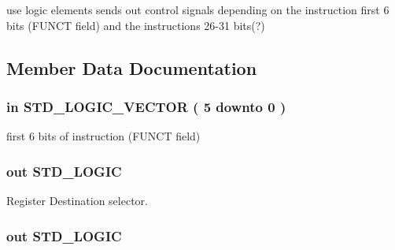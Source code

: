 use logic elements sends out control signals depending on the instruction first 6 bits (\-F\-U\-N\-C\-T field) and the instructions 26-\/31 bits(?) 

\subsection{\-Member \-Data \-Documentation}
\hypertarget{class_control_a837426aa7a23a4b3f1534d7a5a47fd84}{
\subsubsection[{\-Instruction\-\_\-funct}]{ {\bfseries in } {\bfseries \-S\-T\-D\-\_\-\-L\-O\-G\-I\-C\-\_\-\-V\-E\-C\-T\-O\-R (   5    downto    0  ) } }}\label{class_control_a837426aa7a23a4b3f1534d7a5a47fd84}


first 6 bits of instruction (\-F\-U\-N\-C\-T field) 

\hypertarget{class_control_a3e8450f5ca7972a364f6eaffec9c86a2}{
\subsubsection[{\-Reg\-Dst}]{ {\bfseries out } {\bfseries \-S\-T\-D\-\_\-\-L\-O\-G\-I\-C } }}\label{class_control_a3e8450f5ca7972a364f6eaffec9c86a2}


\-Register \-Destination selector. 

\hypertarget{class_control_aec5087b6dc490446af52e39d0264cf50}{
\subsubsection[{\-A\-L\-U\-Src}]{ {\bfseries out } {\bfseries \-S\-T\-D\-\_\-\-L\-O\-G\-I\-C } }}\label{class_control_aec5087b6dc490446af52e39d0264cf50}


